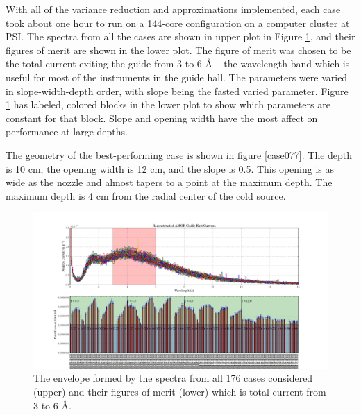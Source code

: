 \documentclass[a4paper]{jpconf}
\begin{document}
With all of the variance reduction and approximations implemented, each case took about one hour to run on a 144-core configuration on a computer cluster at PSI.  The spectra from all the cases are shown in upper plot in Figure \ref{parametric_REH}, and their figures of merit are shown in the lower plot.  The figure of merit was chosen to be the total current exiting the guide from 3 to 6 \AA{} -- the wavelength band which is useful for most of the instruments in the guide hall.  The parameters were varied in slope-width-depth order, with slope being the fasted varied parameter. Figure \ref{parametric_REH} has labeled, colored blocks in the lower plot to show which parameters are constant for that block.  Slope and opening width have the most affect on performance at large depths.

The geometry of the best-performing case is shown in figure \ref{case077}.  The depth is 10 cm, the opening width is 12 cm, and the slope is 0.5.  This opening is as wide as the nozzle and almost tapers to a point at the maximum depth.  The maximum depth is 4 cm from the radial center of the cold source.  

\begin{figure}
\begin{center}
\includegraphics[scale=0.38,trim={1cm 2.35cm 1cm 0cm},clip]{graphics/parametric_REH.pdf}
\end{center}
\caption{\label{parametric_REH}The envelope formed by the spectra from all 176 cases considered (upper) and their figures of merit (lower) which is total current from 3 to 6 \AA{}.}
\end{figure}
\end{document}
